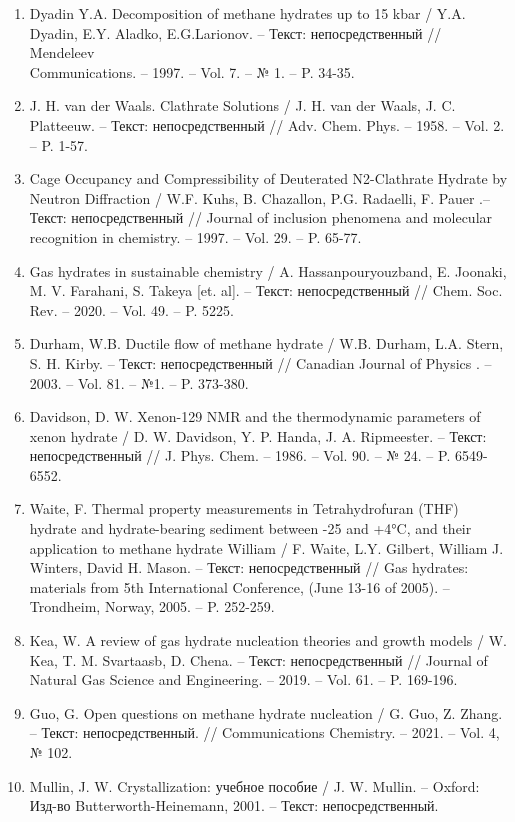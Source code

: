 \begin{enumerate}
    \item Dyadin Y.A. Decomposition of methane hydrates up to 15 kbar / Y.A. Dyadin, E.Y. Aladko, E.G.Larionov. -- Текст: непосредственный // Mendeleev \\ Communications. -- 1997. -- Vol. 7. -- № 1. -- P. 34-35.
    \item J. H. van der Waals. Clathrate Solutions / J. H. van der Waals, J. C. Platteeuw. -- Текст: непосредственный // Adv. Chem. Phys. -- 1958. -- Vol. 2. -- P. 1-57.
    \item Cage Occupancy and Compressibility of Deuterated N2-Clathrate Hydrate by Neutron Diffraction / W.F. Kuhs, B. Chazallon, P.G. Radaelli, F. Pauer .-- Текст: непосредственный // Journal of inclusion phenomena and molecular recognition in chemistry. -- 1997. -- Vol. 29. -- P. 65-77.
    \item Gas hydrates in sustainable chemistry	/ A. Hassanpouryouzband, E. Joonaki, M. V. Farahani, S. Takeya [et. al]. -- Текст: непосредственный // Chem. Soc. Rev. -- 2020. -- Vol. 49. -- P. 5225.
    \item Durham, W.B. Ductile flow of methane hydrate /  W.B. Durham, L.A. Stern, S. H. Kirby. -- Текст: непосредственный // Canadian Journal of Physics . -- 2003. -- Vol. 81. -- №1. -- P. 373-380. 
    \item Davidson, D. W. Xenon-129 NMR and the thermodynamic parameters of xenon hydrate / D. W. Davidson, Y. P. Handa, J. A. Ripmeester. -- Текст: непосредственный // J. Phys. Chem. -- 1986. -- Vol. 90. -- № 24. -- P. 6549-6552.
    \item Waite, F. Thermal property measurements in Tetrahydrofuran (THF) hydrate and hydrate-bearing sediment between -25 and +4°C, and their application to methane hydrate William / F. Waite, L.Y. Gilbert, William J. Winters, David H. Mason. -- Текст: непосредственный // Gas hydrates: materials from 5th International Conference, (June 13-16 of 2005). -- Trondheim, Norway, 2005. -- P. 252-259.
    \item Kea, W. A review of gas hydrate nucleation theories and growth models / W. Kea, T. M. Svartaasb, D. Chena. -- Текст: непосредственный // Journal of Natural Gas Science and Engineering. -- 2019. -- Vol. 61. -- P. 169-196.
    \item Guo, G. Open questions on methane hydrate nucleation / G. Guo, Z. Zhang. -- Текст: непосредственный. // Communications Chemistry. -- 2021. -- Vol. 4, № 102.
    \item Mullin, J. W. Crystallization: учебное пособие / J. W. Mullin. -- Oxford: Изд-во Butterworth-Heinemann, 2001. -- Текст: непосредственный.

\end{enumerate}
